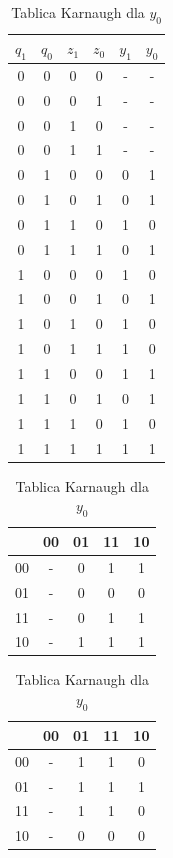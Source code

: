 \documentclass[12pt,a4paper]{article}
\begin{document}
			\begin{table}[H]
			\begin{minipage}{.5\textwidth}
				\caption{Tabela Prawdy - funkcja wyjść}
				\vspace{0.2cm}
				\centering
				\begin{tabular}{cccc|cc}
					\(q_1\)&\(q_0\)&\(z_1\)&\(z_0\)&\(y_1\)&\(y_0\)\\\hline
					0	&	0	&	0	&	0	&	-	&	-	\\
					0	&	0	&	0	&	1	&	-	&	-	\\
					0	&	0	&	1	&	0	&	-	&	-	\\
					0	&	0	&	1	&	1	&	-	&	-	\\\hline
					0	&	1	&	0	&	0	&	0	&	1	\\
					0	&	1	&	0	&	1	&	0	&	1	\\
					0	&	1	&	1	&	0	&	1	&	0	\\
					0	&	1	&	1	&	1	&	0	&	1	\\\hline
					1	&	0	&	0	&	0	&	1	&	0	\\
					1	&	0	&	0	&	1	&	0	&	1	\\
					1	&	0	&	1	&	0	&	1	&	0	\\
					1	&	0	&	1	&	1	&	1	&	0	\\\hline
					1	&	1	&	0	&	0	&	1	&	1	\\
					1	&	1	&	0	&	1	&	0	&	1	\\
					1	&	1	&	1	&	0	&	1	&	0	\\
					1	&	1	&	1	&	1	&	1	&	1	\\
				\end{tabular}
			\end{minipage}%
			\begin{minipage}{.5\textwidth}
				\caption{Tablica Karnaugh dla $y_1$}
				\vspace{0.2cm}
				\centering
				\begin{tabular}{c|c|c|c|c}
					\backslashbox{$z_1z_0$}{$q_1q_0$}&00&01&11&10\\\hline
					00	&	-	&	0	&	1	&	1	\\\hline
					01	&	-	&	0	&	0	&	0	\\\hline
					11	&	-	&	0	&	1	&	1	\\\hline
					10	&	-	&	1	&	1	&	1	
				\end{tabular}
				\vspace{1cm}
				
				\caption{Tablica Karnaugh dla $y_0$}
				\vspace{0.2cm}
				\centering
				\begin{tabular}{c|c|c|c|c}
					\backslashbox{$z_1z_0$}{$q_1q_0$}&00&01&11&10\\\hline
					00	&	-	&	1	&	1	&	0	\\\hline
					01	&	-	&	1	&	1	&	1	\\\hline
					11	&	-	&	1	&	1	&	0	\\\hline
					10	&	-	&	0	&	0	&	0	
				\end{tabular}
			\end{minipage}
			\end{table}
		
\end{document}
